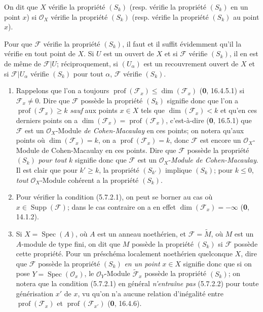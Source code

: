 On dit que $X$ vérifie la propriété $(S_k)$ (resp. vérifie la propriété
$(S_k)$ en un point $x$) si $\mathcal O_X$ vérifie la propriété $(S_k)$
(resp. vérifie la propriété $(S_k)$ au point $x$).

Pour que $\mathscr F$ vérifie la propriété $(S_k)$, il faut et il suffit
évidemment qu'il la vérifie en tout point de $X$. Si $U$ est un ouvert de
$X$ et si $\mathscr F$ vérifie $(S_k)$, il en est de même de
$\mathscr F|U$; réciproquement, si $(U_\alpha)$ est un recouvrement ouvert
de $X$ et si $\mathscr F|U_\alpha$ vérifie $(S_k)$ pour tout $\alpha$,
$\mathscr F$ vérifie $(S_k)$.

\begin{remarks}[5.7.3]
\label{IV.2.s5.7.3-fr}
\begin{enumerate}
\item[(i)] Rappelons que l'on a toujours
$\operatorname{prof}(\mathscr F_x)\leq\dim(\mathscr F_x)$ (\textbf{0}, 16.4.5.1)
si $\mathscr F_x\neq0$. Dire que $\mathscr F$ possède la propriété $(S_k)$
signifie donc que l'on a $\operatorname{prof}(\mathscr F_x)\geq k$ \emph{sauf} aux
points $x\in X$ tels que $\dim(\mathscr F_x)<k$ et qu'en ces derniers points
on a $\dim(\mathscr F_x)=\operatorname{prof}(\mathscr F_x)$, c'est-à-dire
(\textbf{0}, 16.5.1) que $\mathscr F$ est un $\mathcal O_X$-Module \emph{de
Cohen-Macaulay} en ces points; on notera qu'aux points où
$\dim(\mathscr F_x)=k$, on a $\operatorname{prof}(\mathscr F_x)=k$,
donc $\mathscr F$ est encore un $\mathcal O_X$-Module de Cohen-Macaulay en
ces points. Dire que $\mathscr F$ possède la propriété $(S_k)$ \emph{pour tout}
$k$ signifie donc que $\mathscr F$ est un $\mathcal O_X$-\emph{Module de
Cohen-Macaulay}. Il est clair que pour $k'\geq k$, la propriété $(S_{k'})$
implique $(S_k)$; pour $k\leq0$, \emph{tout} $\mathcal O_X$-Module cohérent a la
propriété $(S_k)$.

\item[(ii)] Pour vérifier la condition (5.7.2.1), on peut se borner au cas
où $x\in\operatorname{Supp}(\mathscr F)$; dans le cas contraire on a en
effet $\dim(\mathscr F_x)=-\infty$ (\textbf{0}, 14.1.2).

\item[(iii)] Si $X=\operatorname{Spec}(A)$, où $A$ est un anneau
noethérien, et $\mathscr F=\widetilde M$, où $M$ est un $A$-module de type
fini, on dit que $M$ possède la propriété $(S_k)$ si $\mathscr F$ possède
cette propriété. Pour un préschéma localement noethérien quelconque $X$,
dire que $\mathscr F$ possède la propriété $(S_k)$ \emph{en un point} $x\in X$
signifie donc que si on pose $Y=\operatorname{Spec}(\mathcal O_x)$, le
$\mathcal O_Y$-Module $\widetilde{\mathscr F}_x$ possède la propriété
$(S_k)$; on notera que la condition (5.7.2.1) en général \emph{n'entraîne pas}
(5.7.2.2) pour toute générisation $x'$ de $x$, vu qu'on n'a aucune relation
d'inégalité entre $\operatorname{prof}(\mathscr F_x)$ et
$\operatorname{prof}(\mathscr F_{x'})$ (\textbf{0}, 16.4.6).


\end{enumerate}
\end{remarks}
